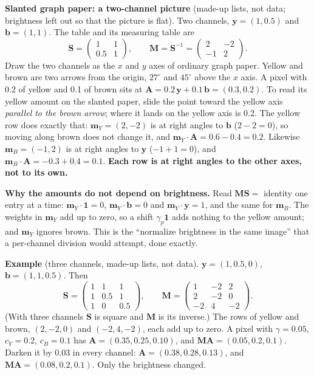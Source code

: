 \documentclass[11pt,letter]{article}
\newcommand{\one}{\mathbf{1}}
\newcommand{\vy}{\mathbf{y}}
\newcommand{\vb}{\mathbf{b}}
\newcommand{\vA}{\mathbf{A}}
\newcommand{\mS}{\mathbf{S}}
\newcommand{\mM}{\mathbf{M}}
\newcommand{\vm}{\mathbf{m}}
\begin{document}
\textbf{Slanted graph paper: a two-channel picture} (made-up lists, not
data; brightness left out so that the picture is flat).  Two channels,
$\vy = (1, 0.5)$ and $\vb = (1, 1)$.  The table and its measuring table are
\[
  \mS = \begin{pmatrix} 1 & 1 \\ 0.5 & 1 \end{pmatrix},
  \qquad
  \mM = \mS^{-1} = \begin{pmatrix} 2 & -2 \\ -1 & 2 \end{pmatrix}.
\]
Draw the two channels as the $x$ and $y$ axes of ordinary graph paper.
Yellow and brown are two arrows from the origin, $27^\circ$ and $45^\circ$
above the $x$ axis.  A pixel with 0.2 of yellow and 0.1 of brown sits at
$\vA = 0.2\,\vy + 0.1\,\vb = (0.3, 0.2)$.  To read its yellow amount on the
slanted paper, slide the point toward the yellow axis \emph{parallel to the
brown arrow}; where it lands on the yellow axis is 0.2.  The yellow row does
exactly that: $\vm_Y = (2, -2)$ is at right angles to $\vb$
($2 - 2 = 0$), so moving along brown does not change it, and
$\vm_Y\cdot\vA = 0.6 - 0.4 = 0.2$.  Likewise $\vm_B = (-1, 2)$ is at right
angles to $\vy$ ($-1 + 1 = 0$), and $\vm_B\cdot\vA = -0.3 + 0.4 = 0.1$.
\textbf{Each row is at right angles to the other axes, not to its own.}

\textbf{Why the amounts do not depend on brightness.}  Read
$\mM\mS = $ identity one entry at a time: $\vm_Y \cdot \one = 0$,
$\vm_Y \cdot \vb = 0$ and $\vm_Y \cdot \vy = 1$, and the same for
$\vm_B$.  The weights in $\vm_Y$ add up to zero, so a shift
$\gamma_p\one$ adds nothing to the yellow amount; and $\vm_Y$ ignores
brown.  This is the ``normalize brightness in the same image'' that a
per-channel division would attempt, done exactly.

\textbf{Example} (three channels, made-up lists, not data).
$\vy = (1, 0.5, 0)$, $\vb = (1, 1, 0.5)$.  Then
\[
  \mS = \begin{pmatrix} 1 & 1 & 1 \\ 1 & 0.5 & 1 \\ 1 & 0 & 0.5 \end{pmatrix},
  \qquad
  \mM = \begin{pmatrix} 1 & -2 & 2 \\ 2 & -2 & 0 \\ -2 & 4 & -2 \end{pmatrix}.
\]
(With three channels $\mS$ is square and $\mM$ is its inverse.)  The rows of
yellow and brown, $(2, -2, 0)$ and $(-2, 4, -2)$, each add up to zero.  A
pixel with $\gamma = 0.05$, $c_Y = 0.2$, $c_B = 0.1$ has
$\vA = (0.35, 0.25, 0.10)$, and $\mM\vA = (0.05, 0.2, 0.1)$.  Darken it by
0.03 in every channel: $\vA = (0.38, 0.28, 0.13)$, and
$\mM\vA = (0.08, 0.2, 0.1)$.  Only the brightness changed.
\end{document}
